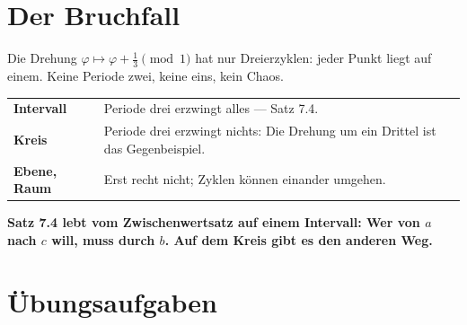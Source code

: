 \section{Der Bruchfall}

\begin{warnung}
Die Drehung $\varphi \mapsto \varphi + \tfrac13 \pmod 1$ hat nur Dreierzyklen: jeder Punkt liegt auf einem. Keine Periode zwei, keine eins, kein Chaos.

\begin{center}
{\small
\renewcommand{\arraystretch}{1.5}
\begin{tabular}{@{}P{2.8cm}P{6.0cm}@{}}
\toprule
\textbf{Intervall} & Periode drei erzwingt alles --- Satz 7.4.\\
\textbf{Kreis} & Periode drei erzwingt nichts: Die Drehung um ein Drittel ist das Gegenbeispiel.\\
\textbf{Ebene, Raum} & Erst recht nicht; Zyklen können einander umgehen.\\
\bottomrule
\end{tabular}}
\end{center}

\begin{center}
\begin{minipage}{0.9\textwidth}
\textbf{Satz 7.4 lebt vom Zwischenwertsatz auf einem Intervall: Wer von $a$ nach $c$ will, muss durch $b$. Auf dem Kreis gibt es den anderen Weg.}
\end{minipage}
\end{center}

\begin{center}
\begin{minipage}{0.88\textwidth}
\end{minipage}
\end{center}
\end{warnung}

\section{Übungsaufgaben}

